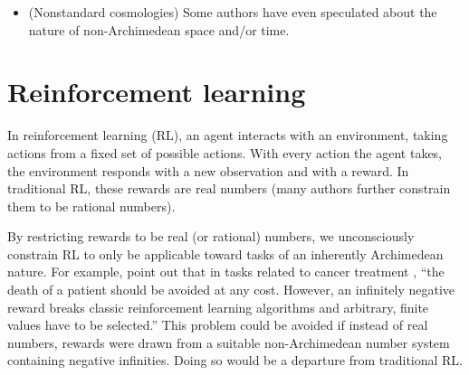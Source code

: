 \documentclass[twoside,11pt]{article}
\begin{document}
\begin{example}
\begin{itemize}
        intelligent than $A_\infty$. We first pointed this out in
        \citep{alexander2019measuring}, where we propose measuring the
        intelligence of mechanical
        knowing agents using computable ordinals, the same non-Archimedean number system
        which proof theorists use to measure logical strength of mathematical
        theories. Incidentally, if AGI intelligence is non-Archimedean, then
        Proposition \ref{maindilemma} shows it is
        impossible to measure machine intelligence using real numbers without some
        of those measurements being misleading\footnote{This would solve an open problem
        implicitly stated by \citet{legg} when they said of their
        real-number universal intelligence measure: ``...none of these people have
        been able to communicate why the work [on measuring universal intelligence
        using real numbers] is so obviously flawed in any concrete way ...
        If anyone would like to properly explain their position to us in the future,
        we promise not to chase you down the street!''}.
        \item
        (Nonstandard cosmologies)
        Some
        authors
        \citep{al2016surreal, andreka2012logic, reeder2012infinitesimals,
        rosinger2007cosmic, chen2019infinitesimal} have
        even speculated about the nature of non-Archimedean space and/or
        time.
    \end{itemize}
\end{example}


\section{Reinforcement learning}
\label{reinforcementlearningsection}

In reinforcement learning (RL), an agent interacts with an environment,
taking actions from a fixed set of possible actions. With every action the
agent takes, the environment responds with a new observation and with a
reward. In traditional RL, these rewards are real numbers (many
authors further constrain them to be rational numbers).

By restricting rewards to be real (or rational) numbers, we unconsciously
constrain RL to only be applicable toward tasks of an inherently Archimedean
nature. For example, \citet{wirth2017survey} point out that
in tasks related to cancer treatment \citep{zhao2009reinforcement},
``the death of a patient should be avoided at any cost. However, an
infinitely negative reward breaks classic reinforcement learning algorithms
and arbitrary, finite values have to be selected.'' This problem could be
avoided if instead of real numbers, rewards were drawn from a suitable
non-Archimedean number system containing negative infinities. Doing so would
be a departure from traditional RL.
\end{document}
